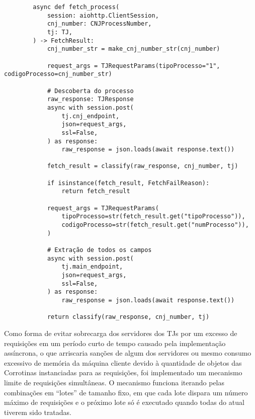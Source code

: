 \begin{listing}[htb]
    \centering
    \tiny
    \begin{verbatim}
        async def fetch_process(
            session: aiohttp.ClientSession,
            cnj_number: CNJProcessNumber,
            tj: TJ,
        ) -> FetchResult:
            cnj_number_str = make_cnj_number_str(cnj_number)

            request_args = TJRequestParams(tipoProcesso="1", codigoProcesso=cnj_number_str)

            # Descoberta do processo
            raw_response: TJResponse
            async with session.post(
                tj.cnj_endpoint,
                json=request_args,
                ssl=False,
            ) as response:
                raw_response = json.loads(await response.text())

            fetch_result = classify(raw_response, cnj_number, tj)

            if isinstance(fetch_result, FetchFailReason):
                return fetch_result

            request_args = TJRequestParams(
                tipoProcesso=str(fetch_result.get("tipoProcesso")),
                codigoProcesso=str(fetch_result.get("numProcesso")),
            )

            # Extração de todos os campos
            async with session.post(
                tj.main_endpoint,
                json=request_args,
                ssl=False,
            ) as response:
                raw_response = json.loads(await response.text())

            return classify(raw_response, cnj_number, tj)
    \end{verbatim}
    \caption{%
        Reprodução do procedimento de busca por processos de maneira
        assíncrona.
    }
    \label{cod:requisição-processos-síncrona-e-assíncrona}
\end{listing}


Como forma de evitar sobrecarga dos servidores dos TJs por um excesso de
requisições em um período curto de tempo causado pela implementação assíncrona,
o que arriscaria sanções de algum dos servidores ou mesmo consumo excessivo de
memória da máquina cliente devido à quantidade de objetos das Corrotinas
instanciadas para as requisições, foi implementado um mecanismo limite de
requisições simultâneas. O mecanismo funciona iterando pelas combinações em
``lotes'' de tamanho fixo, em que cada lote dispara um número máximo de
requisições e o próximo lote só é executado quando todas do atual tiverem sido
tratadas.

